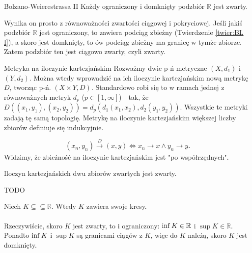 \documentclass{article}
\newcounter{defi}
\numberwithin{defi}{section}
\numberwithin{defi}{section}
\newcommand{\R}{\mathbb{R}}
\newcommand{\oo}{\infty}
\renewcommand{\inf}{\mathop{\mathrm{inf}\vphantom{\mathrm{sup}}}}
\begin{document}
    \begin{twier}{Bolzano-Weierestrassa II} \label{twier:BL II}
        Każdy ograniczony i domknięty podzbiór $\R$ jest zwarty.
    \end{twier}

    \begin{dow}
        Wynika on prosto z równoważności zwartości ciągowej i pokryciowej. Jeśli jakiś podzbiór $\R$ jest ograniczony, to zawiera podciąg zbieżny (Twierdzenie \ref{twier:BL I}), a skoro jest domknięty, to ów podciąg zbieżny ma granicę w tymże zbiorze. Zatem podzbiór ten jest ciągowo zwarty, czyli zwarty.
    \end{dow}


    \begin{defr}{Metryka na iloczynie kartezjańskim}
        Rozważmy dwie p-ń metryczne $(X, d_1)$ i $(Y, d_2)$. Można wtedy wprowadzić na ich iloczynie kartezjańskim nową metrykę $D$, tworząc p-ń. $(X \times Y, D)$. Standardowo robi się to w ramach jednej z równoważnych metryk $d_p$ ($p \in [1, \oo]$) - tak, że $D((x_1, y_1), (x_2, y_2)) = d_p(d_1(x_1, x_2), d_2(y_1, y_2))$. Wszystkie te metryki zadają tę samą topologię. Metrykę na iloczynie kartezjańskim większej liczby zbiorów definiuje się indukcyjnie.
    \end{defr}
    \begin{obs}{}
        \begin{equation}
            (x_n, y_n) \xrightarrow[]{D} (x, y) \iff x_n \to x \wedge y_n \to y.
        \end{equation} Widzimy, że zbieżność na iloczynie kartezjańskim jest "po współrzędnych".
    \end{obs}

    \begin{twier}{} \label{twier:il-kart-zwar}
        Iloczyn kartezjańskich dwu zbiorów zwartych jest zwarty.
    \end{twier}

    \begin{dow}
        TODO
    \end{dow}


    \begin{obs}{} \label{obs:zwar-kres}
        Niech $K \subseteq \subseteq \R$. Wtedy $K$ zawiera swoje kresy. 
    \end{obs}
    \paragraph{} Rzeczywiście, skoro $K$ jest zwarty, to i ograniczony: $\inf K \in \R$ i $\sup K \in \R$. Ponadto $\inf K$ i $\sup K$ są granicami ciągów z $K$, więc do $K$ należą, skoro $K$ jest domknięty.
\end{document}
